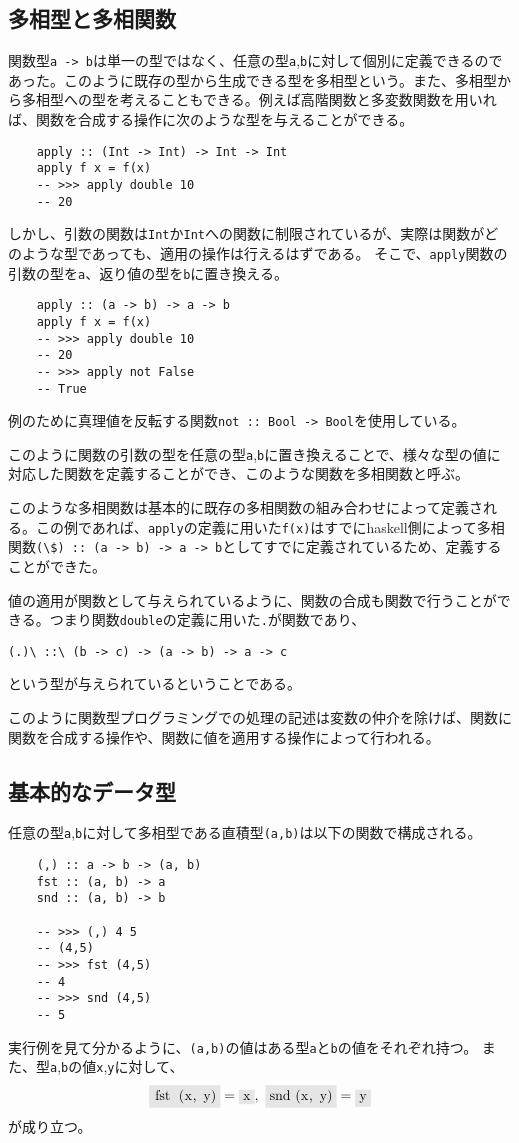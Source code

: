 \documentclass[uplatex,dvipdfmx]{jsarticle}
\newcommand{\pr}[1]{\colorbox[rgb]{0.9,0.9,0.9}{\lstinline{#1}}}
\newcommand{\functype}[2]{\pr{#1 -> #2}}
\newcommand{\fpmor}[3]{\pr{#1 :: #2 -> #3}}
\begin{document}
  \subsection{多相型と多相関数}
  関数型\functype{a}{b}は単一の型ではなく、任意の型\pr{a},\pr{b}に対して個別に定義できるのであった。このように既存の型から生成できる型を多相型という。また、多相型から多相型への型を考えることもできる。例えば高階関数と多変数関数を用いれば、関数を合成する操作に次のような型を与えることができる。
  \begin{lstlisting}
    apply :: (Int -> Int) -> Int -> Int
    apply f x = f(x)
    -- >>> apply double 10
    -- 20
  \end{lstlisting}
  しかし、引数の関数は\pr{Int}か\pr{Int}への関数に制限されているが、実際は関数がどのような型であっても、適用の操作は行えるはずである。
  そこで、\pr{apply}関数の引数の型を\pr{a}、返り値の型を\pr{b}に置き換える。
    \begin{lstlisting}
    apply :: (a -> b) -> a -> b
    apply f x = f(x)
    -- >>> apply double 10
    -- 20
    -- >>> apply not False
    -- True
  \end{lstlisting}
  例のために真理値を反転する関数\fpmor{not}{Bool}{Bool}を使用している。
  
  このように関数の引数の型を任意の型\pr{a},\pr{b}に置き換えることで、様々な型の値に対応した関数を定義することができ、このような関数を多相関数と呼ぶ。

  このような多相関数は基本的に既存の多相関数の組み合わせによって定義される。この例であれば、\pr{apply}の定義に用いた\pr{f(x)}はすでにhaskell側によって多相関数\pr{(\$) :: (a -> b) -> a -> b}としてすでに定義されているため、定義することができた。

  値の適用が関数として与えられているように、関数の合成も関数で行うことができる。つまり関数\pr{double}の定義に用いた\pr{.}が関数であり、
  \begin{center}
    \pr{(.)\ ::\ (b -> c) -> (a -> b) -> a -> c}
  \end{center}
  という型が与えられているということである。

  このように関数型プログラミングでの処理の記述は変数の仲介を除けば、関数に関数を合成する操作や、関数に値を適用する操作によって行われる。
  \subsection{基本的なデータ型}
  任意の型\pr{a},\pr{b}に対して多相型である直積型\pr{(a,b)}は以下の関数で構成される。
  \begin{lstlisting}
    (,) :: a -> b -> (a, b)
    fst :: (a, b) -> a
    snd :: (a, b) -> b

    -- >>> (,) 4 5
    -- (4,5)
    -- >>> fst (4,5)
    -- 4
    -- >>> snd (4,5)
    -- 5
  \end{lstlisting}
  実行例を見て分かるように、\pr{(a,b)}の値はある型\pr{a}と\pr{b}の値をそれぞれ持つ。
  また、型\pr{a},\pr{b}の値\pr{x},\pr{y}に対して、\[\pr{fst (x, y)}=\pr{x},\ \pr{snd (x, y)}=\pr{y}\]が成り立つ。
\end{document}

